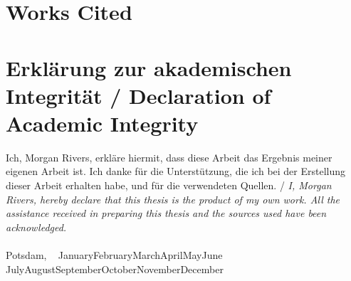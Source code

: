 \documentclass[12pt,a4paper]{article}
\newcommand{\MonthName}{%
  \ifcase\month
  \or January\or February\or March\or April\or May\or June%
  \or July\or August\or September\or October\or November\or December%
  \fi
}
\newcommand{\DateDDMonthYYYY}{\number\day~\MonthName~\number\year}
\begin{document}
\clearpage
\section*{Works Cited}
\printbibliography


\clearpage
\section*{Erklärung zur akademischen Integrität / Declaration of Academic Integrity}
Ich, Morgan Rivers, erkläre hiermit, dass diese Arbeit das Ergebnis meiner eigenen Arbeit ist. Ich danke für die Unterstützung, die ich bei der Erstellung dieser Arbeit erhalten habe, und für die verwendeten Quellen.
/ \emph{I, Morgan Rivers, hereby declare that this thesis is the product of my own work. All the assistance received in preparing this thesis and the sources used have been acknowledged.} \\
\\
Potsdam, \DateDDMonthYYYY
\end{document}
